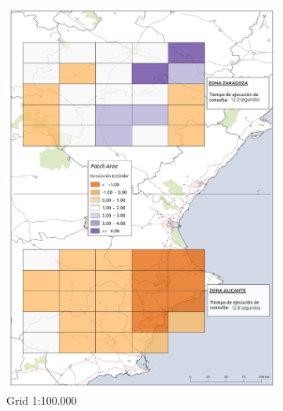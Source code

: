 \begin{figure}
\begin{subfigure}[b]{0.4\textwidth}
    \includegraphics[width=\textwidth]{ResultadosyDiscusion/Figs/Results/p_100.pdf}
    \caption{Grid 1:100.000}
    \label{fig:p_100}
  \end{subfigure}
  \begin{subfigure}[b]{0.4\textwidth}

\end{subfigure}
\end{figure}
